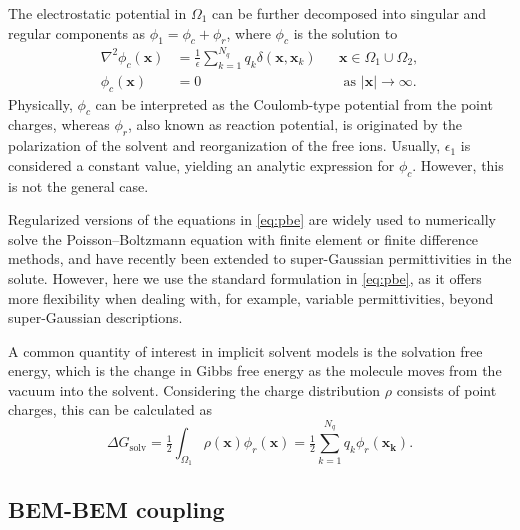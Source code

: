 The electrostatic potential in $\Omega_1$ can be further decomposed into singular and regular components as $\phi_1 = \phi_c + \phi_r$, where $\phi_c$ is the solution to
%
\begin{align}\label{eq:phic}
\nabla^2\phi_c(\mathbf{x}) &= \tfrac{1}{\epsilon}\sum_{k=1}^{N_q}q_k\delta(\mathbf{x},\mathbf{x}_k) &&\mathbf{x}\in\Omega_1\cup\Omega_2,\nonumber\\
\phi_c(\mathbf{x})&=0 &&\text{ as } |\mathbf{x}|\to\infty.
\end{align}
Physically, $\phi_c$ can be interpreted as the Coulomb-type potential from the point charges, whereas $\phi_r$, also known as reaction potential, is originated by the polarization of the solvent and reorganization of the free ions. 
Usually, $\epsilon_1$ is considered a constant value, yielding an analytic expression for $\phi_c$. However, this is not the general case.

Regularized versions of the equations in \eqref{eq:pbe} \cite{LuZhouHolstMcCammon2008, LeeGengZhao2021} are widely used to numerically solve the Poisson--Boltzmann equation with finite element or finite difference methods, and have recently been extended to super-Gaussian permittivities in the solute.\cite{wang2022regularization} However, here we use the standard formulation in \eqref{eq:pbe}, as it offers more flexibility when dealing with, for example, variable permittivities, beyond super-Gaussian descriptions.

A common quantity of interest in implicit solvent models is the solvation free energy, which is the change in Gibbs free energy as the molecule moves from the vacuum into the solvent. Considering the charge distribution $\rho$ consists of point charges, this can be calculated as
%
\begin{equation}\label{eq:dG} 
\Delta G_{\text{solv}} = \tfrac{1}{2}\int_{\Omega_1} \rho(\mathbf{x})\phi_{r}(\mathbf{x}) = \tfrac{1}{2}\sum_{k=1}^{N_q} q_k\phi_r(\mathbf{x_k}).
\end{equation}

\subsection*{\sffamily \large BEM-BEM coupling}

